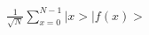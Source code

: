 \documentclass[preview]{standalone}
\begin{document}
\begin{align*}
\frac{1}{\sqrt{N}} \sum_{x=0}^{N-1} |x> |f(x)>
\end{align*}
\end{document}
